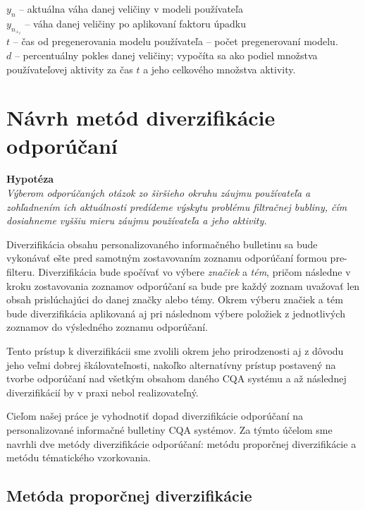 \begin{adjustwidth}{1cm}{1cm}
$y_n$ -- aktuálna váha danej veličiny v modeli používateľa\\
$y_n_+_t$ -- váha danej veličiny po aplikovaní faktoru úpadku\\
$t$ -- čas od pregenerovania modelu používateľa -- počet pregenerovaní modelu.\\
$d$ -- percentuálny pokles danej veličiny; vypočíta sa ako podiel množstva používateľovej aktivity za čas $t$ a jeho celkového množstva aktivity.
\end{adjustwidth}

\section{Návrh metód diverzifikácie odporúčaní}

\textbf{Hypotéza}\\
\textit{Výberom odporúčaných otázok zo širšieho okruhu záujmu používateľa a zohľadnením ich aktuálnosti predídeme výskytu problému
filtračnej bubliny, čím dosiahneme vyššiu mieru záujmu používateľa a jeho aktivity.}

Diverzifikácia obsahu personalizovaného informačného bulletinu sa bude vykonávať ešte pred samotným zostavovaním
zoznamu odporúčaní formou pre-filteru. Diverzifikácia bude spočívať vo výbere \textit{značiek} a \textit{tém}, pričom
následne v kroku zostavovania zoznamov odporúčaní sa bude pre každý zoznam uvažovať len obsah prislúchajúci do danej
značky alebo témy. Okrem výberu značiek a tém bude diverzifikácia aplikovaná aj pri následnom výbere položiek z jednotlivých
zoznamov do výsledného zoznamu odporúčaní.

Tento prístup k diverzifikácii sme zvolili okrem jeho prirodzenosti aj z dôvodu jeho veľmi dobrej škálovateľnosti,
nakoľko alternatívny prístup postavený na tvorbe odporúčaní nad všetkým obsahom daného CQA systému a až následnej
diverzifikácií by v praxi nebol realizovateľný.

Cieľom našej práce je vyhodnotiť dopad diverzifikácie odporúčaní na personalizované informačné bulletiny CQA systémov.
Za týmto účelom sme navrhli dve metódy diverzifikácie odporúčaní: metódu proporčnej diverzifikácie a metódu tématického vzorkovania.

\subsection{Metóda proporčnej diverzifikácie}

